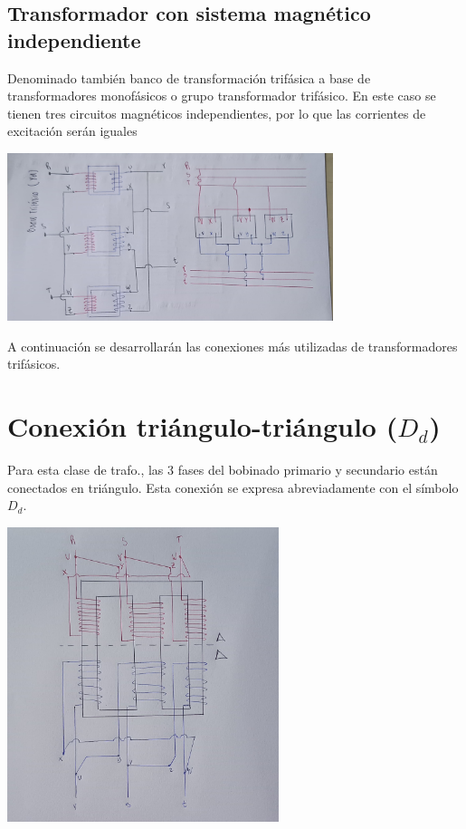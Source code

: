 \documentclass[11pt]{report}
\begin{document}
\subsection{Transformador con sistema magnético independiente}
Denominado también banco de transformación trifásica a base de transformadores
monofásicos o
grupo transformador trifásico. En este caso se tienen tres circuitos magnéticos
independientes,
por lo que las corrientes de excitación serán iguales

\begin{center}
  \includegraphics[width=360px]{trafo-independiente.jpeg}
\end{center}

A continuación se desarrollarán las conexiones más utilizadas de
transformadores trifásicos.

\pagebreak
\section{Conexión triángulo-triángulo ($D_d$)}
Para esta clase de trafo., las 3 fases del bobinado primario y
secundario están conectados en triángulo. Esta conexión se expresa
abreviadamente con el símbolo $D_d$.

\begin{center}
  \includegraphics[width=300px]{trafo-conexion-dd.jpeg}
\end{center}
\pagebreak
\end{document}
